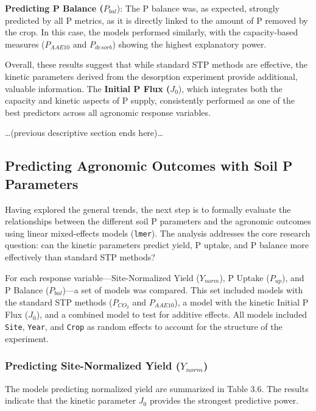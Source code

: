 \documentclass[
  a4paper,
]{article}
\begin{document}
\textbf{Predicting P Balance (}\(P_{bal}\)): The P balance was, as
expected, strongly predicted by all P metrics, as it is directly linked
to the amount of P removed by the crop. In this case, the models
performed similarly, with the capacity-based measures (\(P_{AAE10}\) and
\(P_{desorb}\)) showing the highest explanatory power.

Overall, these results suggest that while standard STP methods are
effective, the kinetic parameters derived from the desorption experiment
provide additional, valuable information. The \textbf{Initial P Flux
(}\(J_0\)), which integrates both the capacity and kinetic aspects of P
supply, consistently performed as one of the best predictors across all
agronomic response variables.

\ldots(previous descriptive section ends here)\ldots{}

\subsection{Predicting Agronomic Outcomes with Soil P
Parameters}\label{predicting-agronomic-outcomes-with-soil-p-parameters-1}

Having explored the general trends, the next step is to formally
evaluate the relationships between the different soil P parameters and
the agronomic outcomes using linear mixed-effects models
(\texttt{lmer}). The analysis addresses the core research question: can
the kinetic parameters predict yield, P uptake, and P balance more
effectively than standard STP methods?

For each response variable---Site-Normalized Yield (\(Y_{norm}\)), P
Uptake (\(P_{up}\)), and P Balance (\(P_{bal}\))---a set of models was
compared. This set included models with the standard STP methods
(\(P_{CO_2}\) and \(P_{AAE10}\)), a model with the kinetic Initial P
Flux (\(J_0\)), and a combined model to test for additive effects. All
models included \texttt{Site}, \texttt{Year}, and \texttt{Crop} as
random effects to account for the structure of the experiment.

\subsubsection{\texorpdfstring{Predicting Site-Normalized Yield
(\(Y_{norm}\))}{Predicting Site-Normalized Yield (Y\_\{norm\})}}\label{predicting-site-normalized-yield-y_norm}

The models predicting normalized yield are summarized in Table 3.6. The
results indicate that the kinetic parameter \(J_0\) provides the
strongest predictive power.
\end{document}
